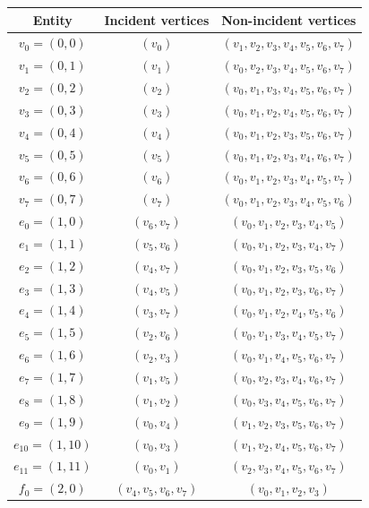 \begin{center}
  \begin{tabular}{ccc}
    \toprule
    Entity & Incident vertices & Non-incident vertices \\
    \hline
    $v_0 = (0, 0)$ & $(v_0)$ & $(v_1, v_2, v_3, v_4, v_5, v_6, v_7)$ \\
    $v_1 = (0, 1)$ & $(v_1)$ & $(v_0, v_2, v_3, v_4, v_5, v_6, v_7)$ \\
    $v_2 = (0, 2)$ & $(v_2)$ & $(v_0, v_1, v_3, v_4, v_5, v_6, v_7)$ \\
    $v_3 = (0, 3)$ & $(v_3)$ & $(v_0, v_1, v_2, v_4, v_5, v_6, v_7)$ \\
    $v_4 = (0, 4)$ & $(v_4)$ & $(v_0, v_1, v_2, v_3, v_5, v_6, v_7)$ \\
    $v_5 = (0, 5)$ & $(v_5)$ & $(v_0, v_1, v_2, v_3, v_4, v_6, v_7)$ \\
    $v_6 = (0, 6)$ & $(v_6)$ & $(v_0, v_1, v_2, v_3, v_4, v_5, v_7)$ \\
    $v_7 = (0, 7)$ & $(v_7)$ & $(v_0, v_1, v_2, v_3, v_4, v_5, v_6)$ \\
    $e_0 = (1, 0)$ & $(v_6, v_7)$ & $(v_0, v_1, v_2, v_3, v_4, v_5)$ \\
    $e_1 = (1, 1)$ & $(v_5, v_6)$ & $(v_0, v_1, v_2, v_3, v_4, v_7)$ \\
    $e_2 = (1, 2)$ & $(v_4, v_7)$ & $(v_0, v_1, v_2, v_3, v_5, v_6)$ \\
    $e_3 = (1, 3)$ & $(v_4, v_5)$ & $(v_0, v_1, v_2, v_3, v_6, v_7)$ \\
    $e_4 = (1, 4)$ & $(v_3, v_7)$ & $(v_0, v_1, v_2, v_4, v_5, v_6)$ \\
    $e_5 = (1, 5)$ & $(v_2, v_6)$ & $(v_0, v_1, v_3, v_4, v_5, v_7)$ \\
    $e_6 = (1, 6)$ & $(v_2, v_3)$ & $(v_0, v_1, v_4, v_5, v_6, v_7)$ \\
    $e_7 = (1, 7)$ & $(v_1, v_5)$ & $(v_0, v_2, v_3, v_4, v_6, v_7)$ \\
    $e_8 = (1, 8)$ & $(v_1, v_2)$ & $(v_0, v_3, v_4, v_5, v_6, v_7)$ \\
    $e_9 = (1, 9)$ & $(v_0, v_4)$ & $(v_1, v_2, v_3, v_5, v_6, v_7)$ \\
    $e_{10} = (1, 10)$ & $(v_0, v_3)$ & $(v_1, v_2, v_4, v_5, v_6, v_7)$ \\
    $e_{11} = (1, 11)$ & $(v_0, v_1)$ & $(v_2, v_3, v_4, v_5, v_6, v_7)$ \\
    $f_0 = (2, 0)$ & $(v_4, v_5, v_6, v_7)$ & $(v_0, v_1, v_2, v_3)$ \\

\end{tabular}
\end{center}
